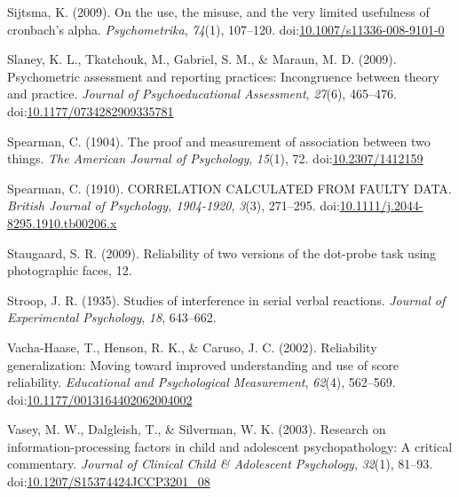 \documentclass[english,,man,floatsintext]{apa6}
\begin{document}
\leavevmode\hypertarget{ref-sijtsma_use_2009}{}%
Sijtsma, K. (2009). On the use, the misuse, and the very limited usefulness of cronbach's alpha. \emph{Psychometrika}, \emph{74}(1), 107--120. doi:\href{https://doi.org/10.1007/s11336-008-9101-0}{10.1007/s11336-008-9101-0}

\leavevmode\hypertarget{ref-slaney_psychometric_2009}{}%
Slaney, K. L., Tkatchouk, M., Gabriel, S. M., \& Maraun, M. D. (2009). Psychometric assessment and reporting practices: Incongruence between theory and practice. \emph{Journal of Psychoeducational Assessment}, \emph{27}(6), 465--476. doi:\href{https://doi.org/10.1177/0734282909335781}{10.1177/0734282909335781}

\leavevmode\hypertarget{ref-spearman_proof_1904}{}%
Spearman, C. (1904). The proof and measurement of association between two things. \emph{The American Journal of Psychology}, \emph{15}(1), 72. doi:\href{https://doi.org/10.2307/1412159}{10.2307/1412159}

\leavevmode\hypertarget{ref-spearman_correlation_1910}{}%
Spearman, C. (1910). CORRELATION CALCULATED FROM FAULTY DATA. \emph{British Journal of Psychology, 1904-1920}, \emph{3}(3), 271--295. doi:\href{https://doi.org/10.1111/j.2044-8295.1910.tb00206.x}{10.1111/j.2044-8295.1910.tb00206.x}

\leavevmode\hypertarget{ref-staugaard_reliability_2009}{}%
Staugaard, S. R. (2009). Reliability of two versions of the dot-probe task using photographic faces, 12.

\leavevmode\hypertarget{ref-stroop_studies_1935}{}%
Stroop, J. R. (1935). Studies of interference in serial verbal reactions. \emph{Journal of Experimental Psychology}, \emph{18}, 643--662.

\leavevmode\hypertarget{ref-vacha-haase_reliability_2002}{}%
Vacha-Haase, T., Henson, R. K., \& Caruso, J. C. (2002). Reliability generalization: Moving toward improved understanding and use of score reliability. \emph{Educational and Psychological Measurement}, \emph{62}(4), 562--569. doi:\href{https://doi.org/10.1177/0013164402062004002}{10.1177/0013164402062004002}

\leavevmode\hypertarget{ref-vasey_research_2003}{}%
Vasey, M. W., Dalgleish, T., \& Silverman, W. K. (2003). Research on information-processing factors in child and adolescent psychopathology: A critical commentary. \emph{Journal of Clinical Child \& Adolescent Psychology}, \emph{32}(1), 81--93. doi:\href{https://doi.org/10.1207/S15374424JCCP3201_08}{10.1207/S15374424JCCP3201\_08}
\end{document}
